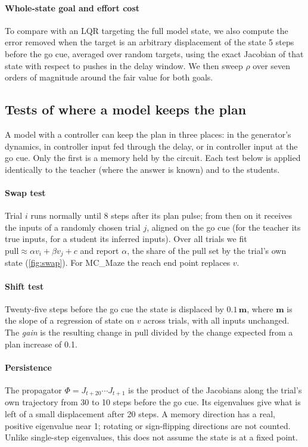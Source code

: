 \documentclass[11pt,a4paper]{article}
\newcommand{\vect}[1]{\bm{#1}}
\newcommand{\pull}{\mathrm{pull}}
\begin{document}
\paragraph{Whole-state goal and effort cost} To compare with an LQR targeting the full model state, we also compute the error removed when the target is an arbitrary displacement of the state 5 steps before the go cue, averaged over random targets, using the exact Jacobian of that state with respect to pushes in the delay window. We then sweep $\rho$ over seven orders of magnitude around the fair value for both goals.

\subsection{Tests of where a model keeps the plan}\label{sec:tests}

A model with a controller can keep the plan in three places: in the generator's dynamics, in controller input fed through the delay, or in controller input at the go cue. Only the first is a memory held by the circuit. Each test below is applied identically to the teacher (where the answer is known) and to the students.

\paragraph{Swap test} Trial $i$ runs normally until 8 steps after its plan pulse; from then on it receives the inputs of a randomly chosen trial $j$, aligned on the go cue (for the teacher its true inputs, for a student its inferred inputs). Over all trials we fit $\pull \approx \alpha v_i + \beta v_j + c$ and report $\alpha$, the share of the pull set by the trial's own state (\cref{fig:swap}). For MC\_Maze the reach end point replaces $v$.

\paragraph{Shift test} Twenty-five steps before the go cue the state is displaced by $0.1\,\vect m$, where $\vect m$ is the slope of a regression of state on $v$ across trials, with all inputs unchanged. The \emph{gain} is the resulting change in pull divided by the change expected from a plan increase of 0.1.

\paragraph{Persistence} The propagator $\Phi = J_{t+20}\cdots J_{t+1}$ is the product of the Jacobians along the trial's own trajectory from 30 to 10 steps before the go cue. Its eigenvalues give what is left of a small displacement after 20 steps. A memory direction has a real, positive eigenvalue near 1; rotating or sign-flipping directions are not counted. Unlike single-step eigenvalues, this does not assume the state is at a fixed point.
\end{document}
